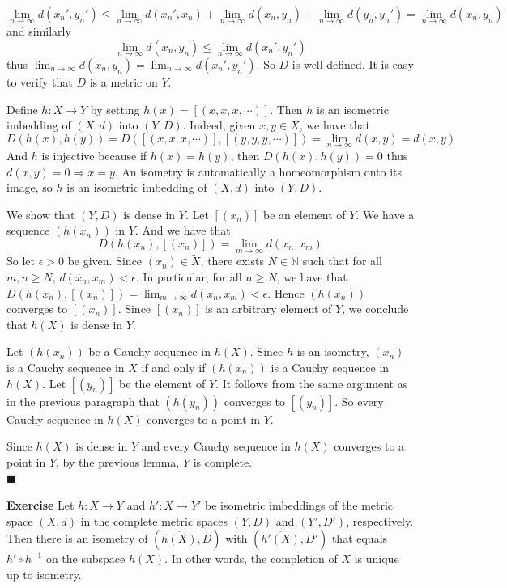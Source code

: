 \documentclass[main.tex]{subfiles}
\begin{document}
\begin{equation}
    \lim_{n \to \infty} d(x_n', y_n') \leq \lim_{n \to \infty} d(x_n', x_n) + \lim_{n \to \infty} d(x_n, y_n) + \lim_{n \to \infty} d(y_n, y_n') = \lim_{n \to \infty} d(x_n, y_n)
\end{equation}
and similarly
\begin{equation}
    \lim_{n \to \infty} d(x_n, y_n) \leq \lim_{n \to \infty} d(x_n', y_n')
\end{equation}
thus $\lim_{n \to \infty} d(x_n, y_n) = \lim_{n \to \infty} d(x_n', y_n')$. So $D$ is well-defined. It is easy to verify that $D$ is a metric on $Y$. 
\par Define $h: X \rightarrow Y$ by setting $h(x) = [(x, x, x, \cdots)]$. Then $h$ is an isometric imbedding of $(X, d)$ into $(Y, D)$. Indeed, given $x, y \in X$, we have that 
\begin{equation}
    D(h(x), h(y)) = D([(x, x, x, \cdots)], [(y, y, y, \cdots)]) = \lim_{n \to \infty} d(x, y) = d(x, y)
\end{equation}
And $h$ is injective because if $h(x) = h(y)$, then $D(h(x), h(y)) = 0$ thus $d(x, y) = 0 \Longrightarrow x = y$. An isometry is automatically a homeomorphism onto its image, so $h$ is an isometric imbedding of $(X, d)$ into $(Y, D)$.  
\par We show that $(Y, D)$ is dense in $Y$. Let $[(x_n)]$ be an element of $Y$.
We have a sequence $(h(x_n))$ in $Y$. And we have that
\begin{equation}
    D(h(x_n), [(x_n)]) = \lim_{m \to \infty} d(x_n, x_m) 
\end{equation}
So let $\epsilon > 0$ be given. Since $(x_n)\in \tilde{X}$, there exists $N \in \mathbb{N}$ such that for all $m, n \geq N$, $d(x_n, x_m) < \epsilon$. In particular, for all $n \geq N$, we have that $D(h(x_n), [(x_n)]) = \lim_{m \to \infty} d(x_n, x_m) < \epsilon$. 
Hence $(h(x_n))$ converges to $[(x_n)]$. Since $[(x_n)]$ is an arbitrary element of $Y$, we conclude that $h(X)$ is dense in $Y$. 
\par Let $(h(x_n))$ be a Cauchy sequence in $h(X)$. Since $h$ is an isometry, $(x_n)$ is a Cauchy sequence in $X$ if and only if $(h(x_n))$ is a Cauchy sequence in $h(X)$. Let $[(y_n)]$ be the element of $Y$. It follows from the same argument as in the previous paragraph that $(h(y_n))$ converges to $[(y_n)]$. So every Cauchy sequence in $h(X)$ converges to a point in $Y$. 
\par Since $h(X)$ is dense in $Y$ and every Cauchy sequence in $h(X)$ converges to a point in $Y$, by the previous lemma, $Y$ is complete. 
\mbox{} \\ \null \hfill $\blacksquare$  


\par \noindent \textbf{Exercise} Let $h: X \rightarrow Y$ and $h': X \rightarrow Y'$ be isometric imbeddings of the metric space $(X, d)$ in the complete metric spaces $(Y, D)$ and $(Y', D')$, respectively. Then there is an isometry of $(\overline{h(X)}, D)$ with $(\overline{h'(X)}, D')$ that equals $h'\circ h^{-1}$ on the subspace $h(X)$. In other words, the completion of $X$ is unique up to isometry. 
\end{document}
